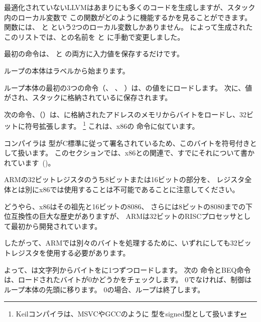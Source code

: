 ﻿

\mysubparagraph{\NonOptimizingXcodeIV (\ARMMode)}



最適化されていないLLVMはあまりにも多くのコードを生成しますが、スタック内のローカル変数で
この関数がどのように機能するかを見ることができます。
関数には、 と という2つのローカル変数しかありません。 
\IDA によって生成されたこのリストでは、との名前を と に手動で変更しました。

最初の命令は、 と の両方に入力値を保存するだけです。

ループの本体はラベルから始まります。

ループ本体の最初の3つの命令（、 \ADD、 ）は、の値をにロードします。
次に、値がされ、スタックに格納されているに保存されます。

次の命令、（）は、に格納されたアドレスのメモリからバイトをロードし、32ビットに符号拡張します。
\footnote{Keilコンパイラは、MSVCやGCCのように \Tchar 型をsigned型として扱います}
これは、x86の \MOVSX 命令に似ています。

コンパイラは \Tchar 型がC標準に従って署名されているため、このバイトを符号付きとして扱います。
このセクションでは、x86との関連で、すでにそれについて書かれています~()。


ARMの32ビットレジスタのうち8ビットまたは16ビットの部分を、
レジスタ全体とは別にx86では使用することは不可能であることに注意してください。

どうやら、x86はその祖先と16ビットの8086、
さらには8ビットの8080までの下位互換性の巨大な歴史がありますが、
ARMは32ビットのRISCプロセッサとして最初から開発されています。

したがって、ARMでは別々のバイトを処理するために、いずれにしても32ビットレジスタを使用する必要があります。

よって、は文字列からバイトをに1つずつロードします。
次の \CMP 命令と\ac{BEQ}命令は、ロードされたバイトが0かどうかをチェックします。
0でなければ、制御はループ本体の先頭に移ります。 
0の場合、ループは終了します。

